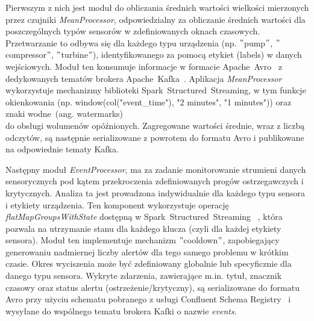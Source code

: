 Pierwszym z nich jest moduł do obliczania średnich wartości wielkości mierzonych przez czujniki \textit{\mbox{MeanProcessor}}, odpowiedzialny za obliczanie średnich wartości dla poszczególnych typów sensorów w zdefiniowanych oknach czasowych. Przetwarzanie to odbywa się dla każdego typu urządzenia (np. \("\)pump\("\), \("\)compressor\("\), \("\)turbine\("\)), identyfikowanego za pomocą etykiet (labels) w danych wejściowych. Moduł ten konsumuje informacje w formacie \mbox{Apache Avro}~\cite{avro_documentation} z dedykowanych tematów brokera \mbox{Apache Kafka}~\cite{kafka}. Aplikacja \textit{\mbox{MeanProcessor}} wykorzystuje mechanizmy biblioteki \mbox{Spark Structured Streaming}, w tym funkcje okienkowania (np. window(col("event\_time"), "2 minutes", "1 minutes")) oraz znaki wodne~(ang. watermarks) \\ \cite{watermarking} do obsługi wolumenów opóźnionych. Zagregowane wartości średnie, wraz z liczbą odczytów, są następnie serializowane z powrotem do formatu Avro i publikowane na odpowiednie tematy Kafka.

Następny moduł \textit{EventProcessor}, ma za zadanie monitorowanie strumieni danych sensorycznych pod kątem przekroczenia zdefiniowanych progów ostrzegawczych i krytycznych. Analiza ta jest prowadzona indywidualnie dla każdego typu sensora i etykiety urządzenia. Ten komponent wykorzystuje operację \textit{flatMapGroupsWithState} dostępną w \mbox{Spark Structured Streaming}~\cite{spark_streaming} , która pozwala na utrzymanie stanu dla każdego klucza (czyli dla każdej etykiety sensora). Moduł ten implementuje mechanizm \("\)cooldown\("\), zapobiegający generowaniu nadmiernej liczby alertów dla tego samego problemu w krótkim czasie. Okres wyciszenia może być zdefiniowany globalnie lub specyficznie dla danego typu sensora. Wykryte zdarzenia, zawierające m.in. tytuł, znacznik czasowy oraz status alertu (ostrzeżenie/krytyczny), są serializowane do formatu Avro przy użyciu schematu pobranego z usługi Confluent Schema Registry~\cite{confluent_schema_registry} i wysyłane do wspólnego tematu brokera Kafki o nazwie \textit{events}.

